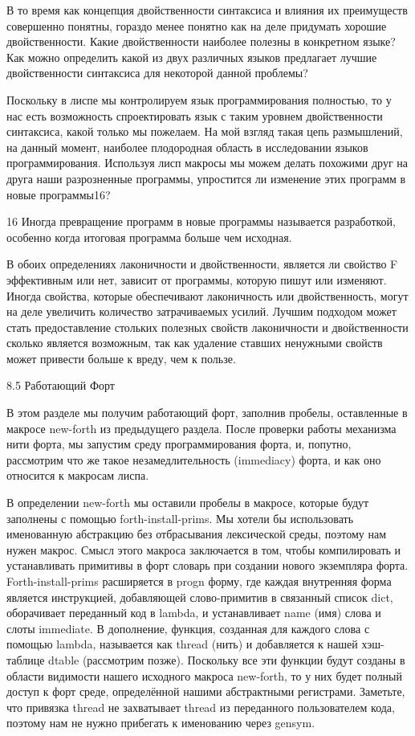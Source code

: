 В то время как концепция двойственности синтаксиса и влияния их преимуществ совершенно понятны, гораздо менее понятно как на деле придумать хорошие двойственности. Какие двойственности наиболее полезны в конкретном языке? Как можно определить какой из двух различных языков предлагает лучшие двойственности синтаксиса для некоторой данной проблемы?

Поскольку в лиспе мы контролируем язык программирования полностью, то у нас есть возможность спроектировать язык с таким уровнем двойственности синтаксиса, какой только мы пожелаем. На мой взгляд такая цепь размышлений, на данный момент, наиболее плодородная область в исследовании языков программирования. Используя лисп макросы мы можем делать похожими друг на друга наши разрозненные программы, упростится ли изменение этих программ в новые программы16?

16 Иногда превращение программ в новые программы называется разработкой, особенно когда итоговая программа больше чем исходная.

В обоих определениях лаконичности и двойственности, является ли свойство F эффективным или нет, зависит от программы, которую пишут или изменяют. Иногда свойства, которые обеспечивают лаконичность или двойственность, могут на деле увеличить количество затрачиваемых усилий. Лучшим подходом может стать предоставление стольких полезных свойств лаконичности и двойственности сколько является возможным, так как удаление ставших ненужными свойств может привести больше к вреду, чем к пользе.

8.5 Работающий Форт

В этом разделе мы получим работающий форт, заполнив пробелы, оставленные в макросе new-forth из предыдущего раздела. После проверки работы механизма нити форта, мы запустим среду программирования форта, и, попутно, рассмотрим что же такое незамедлительность (immediacy) форта, и как оно относится к макросам лиспа.

В определении new-forth мы оставили пробелы в макросе, которые будут заполнены с помощью forth-install-prims. Мы хотели бы использовать именованную абстракцию без отбрасывания лексической среды, поэтому нам нужен макрос. Смысл этого макроса заключается в том, чтобы компилировать и устанавливать примитивы в форт словарь при создании нового экземпляра форта. Forth-install-prims расширяется в progn форму, где каждая внутренняя форма является инструкцией, добавляющей слово-примитив в связанный список dict, оборачивает переданный код в lambda, и устанавливает name (имя) слова и слоты immediate. В дополнение, функция, созданная для каждого слова с помощью lambda, называется как thread (нить) и добавляется к нашей хэш-таблице dtable (рассмотрим позже). Поскольку все эти функции будут созданы в области видимости нашего исходного макроса new-forth, то у них будет полный доступ к форт среде, определённой нашими абстрактными регистрами. Заметьте, что привязка thread не захватывает thread из переданного пользователем кода, поэтому нам не нужно прибегать к именованию через gensym.


